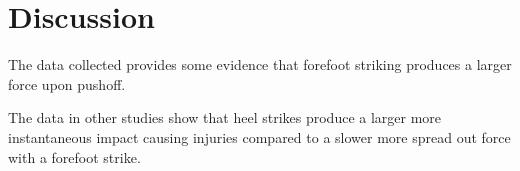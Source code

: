 \section{Discussion}

The data collected provides some evidence that forefoot striking produces a larger force upon pushoff. 

The data in other studies show that heel strikes produce a larger more instantaneous impact causing injuries compared to a slower more spread out force with a forefoot strike. 
